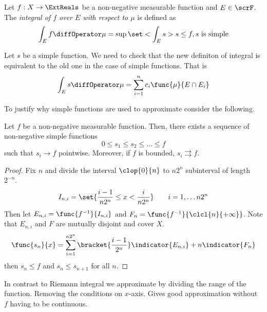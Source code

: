 \begin{definition}
    Let \(f:X \to \ExtReals\) be a non-negative measurable function and \(E \in \scrF\). The \textit{integral of \(f\) over \(E\) with respect to \(\mu\)} is defined as 
    \begin{equation*}
        \int_E f \diffOperator \mu = \sup \set<\int_E s >{s\leq f, s\ \mathrm{is\ simple}}
    \end{equation*}
\end{definition}

Let \(s\) be a simple function. We need to check that the new definiton of integral is equivalent to the old one in the case of simple functions. That is 
\begin{equation*}
    \int_E s \diffOperator \mu =  \sum_{i = 1}^n c_i \func{\mu}{E \cap E_i}
\end{equation*}

To justify why simple functions are used to approximate consider the following. 

\begin{theorem}
    Let \(f\) be a non-negative measurable function. Then, there exists a sequence of non-negative simple functions 
    \begin{equation*}
        0 \leq s_1 \leq s_2 \leq \dots \leq f
    \end{equation*}
    such that \(s_i \to f\) pointwise. Moreover, if \(f\) is bounded, \(s_i \rightrightarrows f\).
\end{theorem}

\begin{proof}
    Fix \(n\) and divide the interval \(\clop{0}{n}\) to \(n2^n\) subinterval of length \(2^{-n}\). 
    \begin{equation*}
        I_{n,i} = \set{\dfrac{i-1}{n2^n} \leq x < \dfrac{i}{n2^n}} \qquad i = 1, \dots n2^n
    \end{equation*}
    Then let \(E_{n,i} = \func{f^{-1}}{I_{n,i}}\) and \(F_n = \func{f^{-1}}{\clcl{n}{+\infty}}\). Note that \(E_{n,i}\) and \(F\) are mutually disjoint and cover \(X\).
    \begin{equation*}
        \func{s_n}{x} = \sum_{i = 1}^{n2^n} \bracket{\dfrac{i - 1}{2^n}} \indicator{E_{n,i}} + n \indicator{F_n}
    \end{equation*}
    then \(s_n \leq f\) and \(s_n \leq s_{n+1}\) for all \(n\).
\end{proof}

In contrast to Riemann integral we approximate by dividing the range of the function. Removing the conditions on \(x\)-axis. Gives good approximation without \(f\) having to be continuous.

